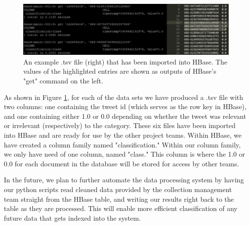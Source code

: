 \begin{figure}[ht]
	\centering
	\includegraphics[scale=.65]{figures/hbase-data.png}
    \caption{An example .tsv file (right) that has been imported into HBase. The values of the highlighted entries are shown as outputs of HBase's "get" command on the left.}\label{fig:hbase-data}
\end{figure}

As shown in Figure \ref{fig:hbase-data}, for each of the data sets we have produced a .tsv file with two columns: one containing the tweet id (which serves as the row key in HBase), and one containing either 1.0 or 0.0 depending on whether the tweet was relevant or irrelevant (respectively) to the category. These six files have been imported into HBase and are ready for use by the other project teams. Within HBase, we have created a column family named "classification." Within our column family, we only have need of one column, named "class." This column is where the 1.0 or 0.0 for each document in the database will be stored for access by other teams.

In the future, we plan to further automate the data processing system by having our python scripts read cleaned data provided by the collection management team straight from the HBase table, and writing our results right back to the table as they are processed. This will enable more efficient classification of any future data that gets indexed into the system.









